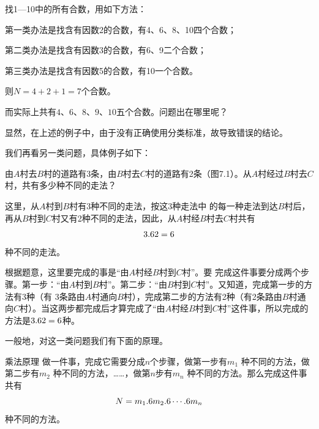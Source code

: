 \begin{example}
    找1—10中的所有合数，用如下方法：

第一类办法是找含有因数2的合数，有4、6、8、10四个合数；

第二类办法是找含有因数3的合数，有6、9二个合数；

第三类办法是找含有因数5的合数，有10一个合数。

则$N=4+2+1=7$个合数。
\end{example}

而实际上共有$4$、$6$、$8$、$9$、$10$五个合数。问题出在哪里呢？

显然，在上述的例子中，由于没有正确使用分类标准，故导致错误的结论。

我们再看另一类问题，具体例子如下：

由$A$村去$B$村的道路有3条，由$B$村去$C$村的道路有2条（图7.1）。从$A$村经过$B$村去$C$村，共有多少种不同的走法？

\begin{figure}[htp]
    \centering
{}
    \caption{}
\end{figure}

这里，从$A$村到$B$村有3种不同的走法，按这3种走法中
的每一种走法到达$B$村后，再从$B$村到$C$村又有2种不同的走法，因此，从$A$村经$B$村去$C$村共有
\[3.6 2=6\]
种不同的走法。

根据题意，这里要完成的事是“由$A$村经$B$村到$C$村”。要
完成这件事要分成两个步骤。第一步：“由$A$村到$B$村”。第二步：“由$B$村到$C$村”。又知道，完成第一步的方法有3种（有 3条路由$A$村通向$B$村），完成第二步的方法有2种（有2条路由$B$村通向$C$村）。当这两步都完成后才算完成了“由$A$村经$B$村到$C$村”这件事，所以完成的方法是$3.6  2=6$种。

一般地，对这一类问题我们有下面的原理。
\begin{thm}
    {乘法原理} 做一件事，完成它需要分成$n$个步骤，做第一步有$m_{1}$ 种不同的方法，做第二步有$m_{2}$ 种不同的方法，……，做第$n$步有$m_{n}$ 种不同的方法。那么完成这件事共有
\[
N=m_{1}\x m_{2}\x\cdots \x m_{n}
\]
种不同的方法。
\end{thm}


